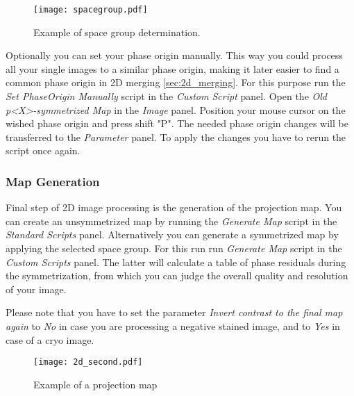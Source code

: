 \begin{figure}
		\centering
		\texttt{[image: spacegroup.pdf]}
		\caption{Example of space group determination.}
		\label{fig:spacegroup}
	\end{figure}

Optionally you can set your phase origin manually. This way you could process all your single images to a similar phase origin, making it later easier to find a common phase origin in 2D merging \autoref{sec:2d_merging}. For this purpose run the \textit{Set PhaseOrigin Manually} script in the  \textit{Custom Script} panel. Open the  \textit{Old p<X>-symmetrized Map} in the  \textit{Image} panel. 
Position your mouse cursor on the wished phase origin and press shift "P". The needed phase origin changes will be transferred to the  \textit{Parameter} panel. To apply the changes you have to rerun the script once again.

	
\subsubsection{Map Generation}	

Final step of 2D image processing is the generation of the projection map. You can create an unsymmetrized map by running the \textit{Generate Map} script in the \textit{Standard Scripts} panel. Alternatively you can generate a symmetrized map by applying the selected space group. For this run run \textit{Generate Map} script in the \textit{Custom Scripts} panel. The latter will calculate a table of phase residuals during the symmetrization, from which you can judge the overall quality and resolution of your image. 

Please note that you have to set the parameter \textit{Invert contrast to the final map again} to \textit{No} in case you are processing a negative stained image, and to \textit{Yes} in case of a cryo image. 


	\begin{figure}[H]
		\centering
		\texttt{[image: 2d\_second.pdf]}
		\caption{Example of a projection map}
		\label{fig:2d_second}
	\end{figure}
	

	
		
